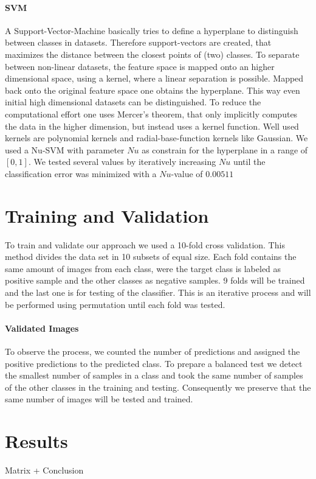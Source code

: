 \documentclass[a4paper,10pt]{article}
\begin{document}
\paragraph{SVM}
A Support-Vector-Machine basically tries to define a hyperplane to distinguish between classes in datasets. Therefore support-vectors are created, that maximizes the distance between the closest points of (two) classes. To separate between non-linear datasets, the feature space is mapped onto an higher dimensional space, using a kernel, where a linear separation is possible. Mapped back onto the original feature space one obtains the hyperplane. This way even initial high dimensional datasets can be distinguished. To reduce the computational effort one uses Mercer's theorem, that only implicitly computes the data in the higher dimension, but instead uses a kernel function. Well used kernels are polynomial kernels and radial-base-function kernels like Gaussian. We used a Nu-SVM with parameter $Nu$ as constrain for the hyperplane in a range of $[0,1]$. We tested several values by iteratively increasing $Nu$ until the classification error was minimized with a $Nu$-value of $0.00511$ 

\section{Training and Validation}
To train and validate our approach we used a 10-fold cross validation. 
This method divides the data set in 10 subsets of equal size. Each fold contains the same amount of images from each class, were the target class is labeled as positive sample and the other classes as negative samples. 9 folds will be trained and the last one is for testing of the classifier.
This is an iterative process and will be performed using permutation until each fold was tested.
\paragraph{Validated Images}
To observe the process, we counted the number of predictions and assigned the positive predictions to the predicted class.
To prepare a balanced test we detect the smallest number of samples in a class and took the same number of samples of the other classes in the training and testing. 
Consequently we preserve that the same number of images will be tested and trained.
\section{Results}
Matrix + Conclusion 
\end{document}
